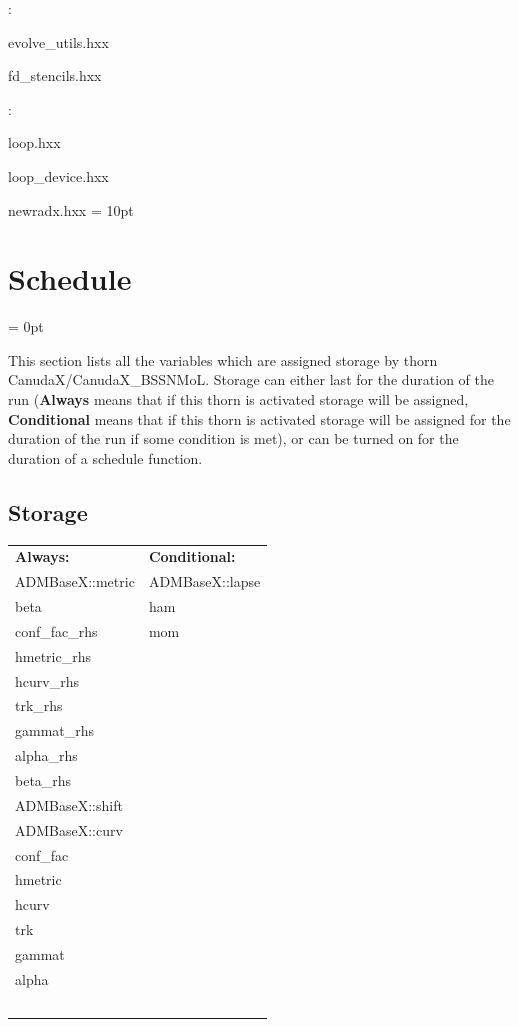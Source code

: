 \vspace{5mm}

: 



evolve\_utils.hxx

fd\_stencils.hxx
\vspace{2mm}

: 

loop.hxx

loop\_device.hxx

newradx.hxx
\vspace{2mm}\parskip = 10pt 

\section{Schedule} 


\parskip = 0pt


\noindent This section lists all the variables which are assigned storage by thorn CanudaX/CanudaX\_BSSNMoL.  Storage can either last for the duration of the run ({\bf Always} means that if this thorn is activated storage will be assigned, {\bf Conditional} means that if this thorn is activated storage will be assigned for the duration of the run if some condition is met), or can be turned on for the duration of a schedule function.


\subsection*{Storage}

\hspace{5mm}

 \begin{tabular*}{160mm}{ll} 

{\bf Always:}& {\bf Conditional:} \\ 
 ADMBaseX::metric &  ADMBaseX::lapse\\ 
 beta &  ham\\ 
 conf\_fac\_rhs &  mom\\ 
 hmetric\_rhs & ~\\ 
 hcurv\_rhs & ~\\ 
 trk\_rhs & ~\\ 
 gammat\_rhs & ~\\ 
 alpha\_rhs & ~\\ 
 beta\_rhs & ~\\ 
 ADMBaseX::shift & ~\\ 
 ADMBaseX::curv & ~\\ 
 conf\_fac & ~\\ 
 hmetric & ~\\ 
 hcurv & ~\\ 
 trk & ~\\ 
 gammat & ~\\ 
 alpha & ~\\ 
~ & ~\\ 
\end{tabular*} 


